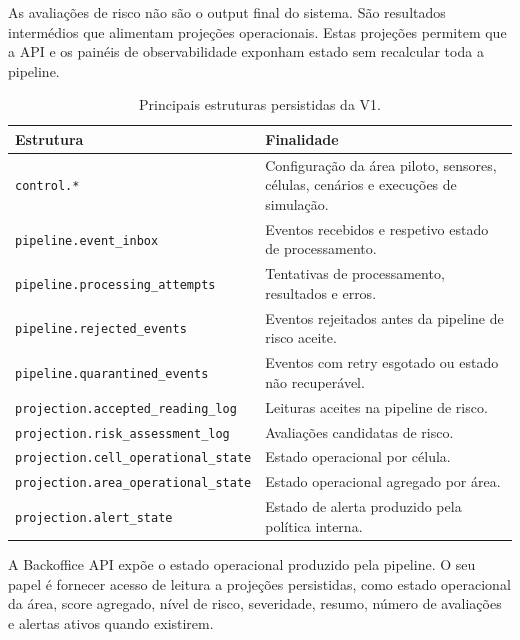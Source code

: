 As avaliações de risco não são o output final do sistema. São resultados intermédios que alimentam projeções operacionais. Estas projeções permitem que a API e os painéis de observabilidade exponham estado sem recalcular toda a pipeline.

\begin{table}[h]
\centering
\caption{Principais estruturas persistidas da V1.}
\label{tab:v1-persisted-structures}
\begin{tabular}{p{} p{}}
\hline
\textbf{Estrutura} & \textbf{Finalidade} \\
\hline
\texttt{control.*} & Configuração da área piloto, sensores, células, cenários e execuções de simulação. \\
\texttt{pipeline.}\newline\texttt{event\_inbox} & Eventos recebidos e respetivo estado de processamento. \\
\texttt{pipeline.}\newline\texttt{processing\_attempts} & Tentativas de processamento, resultados e erros. \\
\texttt{pipeline.}\newline\texttt{rejected\_events} & Eventos rejeitados antes da pipeline de risco aceite. \\
\texttt{pipeline.}\newline\texttt{quarantined\_events} & Eventos com retry esgotado ou estado não recuperável. \\
\texttt{projection.}\newline\texttt{accepted\_reading\_log} & Leituras aceites na pipeline de risco. \\
\texttt{projection.}\newline\texttt{risk\_assessment\_log} & Avaliações candidatas de risco. \\
\texttt{projection.}\newline\texttt{cell\_operational\_state} & Estado operacional por célula. \\
\texttt{projection.}\newline\texttt{area\_operational\_state} & Estado operacional agregado por área. \\
\texttt{projection.}\newline\texttt{alert\_state} & Estado de alerta produzido pela política interna. \\
\hline
\end{tabular}
\end{table}

A Backoffice API expõe o estado operacional produzido pela pipeline. O seu papel é fornecer acesso de leitura a projeções persistidas, como estado operacional da área, score agregado, nível de risco, severidade, resumo, número de avaliações e alertas ativos quando existirem.

